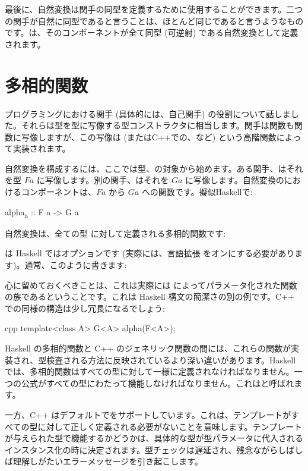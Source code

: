 最後に、自然変換は関手の同型を定義するために使用することができます。二つの関手が自然に同型であると言うことは、ほとんど同じであると言うようなものです。は、そのコンポーネントが全て同型 (可逆射) である自然変換として定義されます。

\section{多相的関数}

プログラミングにおける関手 (具体的には、自己関手) の役割について話しました。それらは型を型に写像する型コンストラクタに相当します。関手は関数も関数に写像しますが、この写像は (またはC++での、など) という高階関数によって実装されます。

自然変換を構成するには、ここでは型、の対象から始めます。ある関手、はそれを型 $F a$ に写像します。別の関手、はそれを $G a$ に写像します。自然変換のにおけるコンポーネントは、$F a$ から $G a$ への関数です。擬似Haskellで: 

\begin{snipv}
alpha\textsubscript{a} :: F a -> G a
\end{snipv}
自然変換は、全ての型  に対して定義される多相的関数です: 

 は Haskell ではオプションです (実際には、言語拡張  をオンにする必要があります)。通常、このように書きます: 

心に留めておくべきことは、これは実際には  によってパラメータ化された関数の族であるということです。これは Haskell 構文の簡潔さの別の例です。C++ での同様の構造は少し冗長になるでしょう: 

\begin{snip}{cpp}
template<class A> G<A> alpha(F<A>);
\end{snip}
Haskell の多相的関数と C++ のジェネリック関数の間には、これらの関数が実装され、型検査される方法に反映されているより深い違いがあります。Haskell では、多相的関数はすべての型に対して一様に定義されなければなりません。一つの公式がすべての型にわたって機能しなければなりません。これはと呼ばれます。

一方、C++ はデフォルトでをサポートしています。これは、テンプレートがすべての型に対して正しく定義される必要がないことを意味します。テンプレートが与えられた型で機能するかどうかは、具体的な型が型パラメータに代入されるインスタンス化の時に決定されます。型チェックは遅延され、残念ながらしばしば理解しがたいエラーメッセージを引き起こします。

